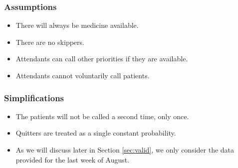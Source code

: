\subsubsection{Assumptions}
\begin{itemize}
\item There will always be medicine available.
\item There are no skippers.
\item Attendants can call other priorities if they are available.
\item Attendants cannot voluntarily call patients.
\end{itemize}


\subsubsection{Simplifications}
\begin{itemize}
\item The patients will not be called a second time, only once.
\item Quitters are treated as a single constant probability.
\item As we will discuss later in Section \ref{sec:valid}, we only consider the data provided for the last week of August.
\end{itemize}


